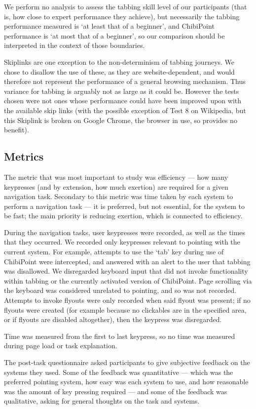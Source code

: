 \documentclass[11pt,openright,a4paper]{report}
\begin{document}
We perform no analysis to assess the tabbing skill level of our participants (that is, how close to expert performance they achieve), but necessarily the tabbing performance measured is `at least that of a beginner', and ChibiPoint performance is `at most that of a beginner', so our comparison should be interpreted in the context of those boundaries.

Skiplinks are one exception to the non-determinism of tabbing journeys. We chose to disallow the use of these, as they are website-dependent, and would therefore not represent the performance of a general browsing mechanism. Thus variance for tabbing is arguably not as large as it could be. However the tests chosen were not ones whose performance could have been improved upon with the available skip links (with the possible exception of Test 8 on Wikipedia, but this Skiplink is broken on Google Chrome, the browser in use, so provides no benefit).

\subsection{Metrics}
The metric that was most important to study was efficiency --- how many keypresses (and by extension, how much exertion) are required for a given navigation task. Secondary to this metric was time taken by each system to perform a navigation task --- it is preferred, but not essential, for the system to be fast; the main priority is reducing exertion, which is connected to efficiency.

During the navigation tasks, user keypresses were recorded, as well as the times that they occurred. We recorded only keypresses relevant to pointing with the current system. For example, attempts to use the `tab' key during use of ChibiPoint were intercepted, and answered with an alert to the user that tabbing was disallowed. We disregarded keyboard input that did not invoke functionality within tabbing or the currently activated version of ChibiPoint. Page scrolling via the keyboard was considered unrelated to pointing, and so was not recorded. Attempts to invoke flyouts were only recorded when said flyout was present; if no flyouts were created (for example because no clickables are in the specified area, or if flyouts are disabled altogether), then the keypress was disregarded.

Time was measured from the first to last keypress, so no time was measured during page load or task explanation.

The post-task questionnaire asked participants to give subjective feedback on the systems they used. Some of the feedback was quantitative --- which was the preferred pointing system, how easy was each system to use, and how reasonable was the amount of key pressing required --- and some of the feedback was qualitative, asking for general thoughts on the task and systems.
\end{document}
